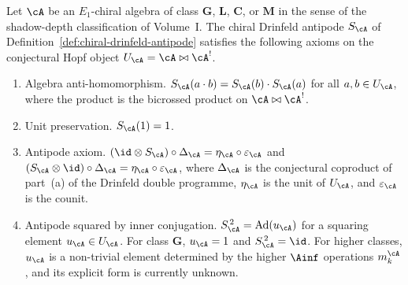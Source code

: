 \begin{conjecture}
\label{conj:drinfeld-double-antipode}
Let $\cA$ be an $E_1$-chiral algebra of class $\mathbf{G}$, $\mathbf{L}$,
$\mathbf{C}$, or $\mathbf{M}$ in the sense of the shadow-depth
classification of Volume~I. The chiral Drinfeld antipode $S_\cA$ of
Definition~\ref{def:chiral-drinfeld-antipode} satisfies the following
axioms on the conjectural Hopf object $U_\cA = \cA \bowtie \cA^!$.
\begin{enumerate}[label=\textup{(\alph*)}]
\item \textup{Algebra anti-homomorphism.}
$S_\cA(a \cdot b) = S_\cA(b) \cdot S_\cA(a)$ for all $a, b \in U_\cA$,
where the product is the bicrossed product on
$\cA \bowtie \cA^!$.
\item \textup{Unit preservation.} $S_\cA(1) = 1$.
\item \textup{Antipode axiom.}
$(\id \otimes S_\cA) \circ \Delta_\cA = \eta_\cA \circ \varepsilon_\cA$
and
$(S_\cA \otimes \id) \circ \Delta_\cA = \eta_\cA \circ \varepsilon_\cA$,
where $\Delta_\cA$ is the conjectural coproduct of part~(a) of the
Drinfeld double programme, $\eta_\cA$ is the unit of
$U_\cA$, and $\varepsilon_\cA$ is the counit.
\item \textup{Antipode squared by inner conjugation.}
$S_\cA^{\,2} = \mathrm{Ad}(u_\cA)$ for a squaring element
$u_\cA \in U_\cA$. For class $\mathbf{G}$, $u_\cA = 1$ and
$S_\cA^{\,2} = \id$. For higher classes, $u_\cA$ is a
non-trivial element determined by the higher $\Ainf$ operations
$m_k^{\cA}$, and its explicit form is currently unknown.
\end{enumerate}
\end{conjecture}

